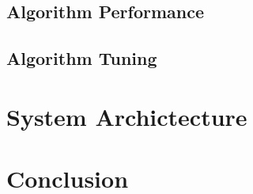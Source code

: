 \subsection{Algorithm Performance}

\subsection{Algorithm Tuning}

\section{System Archictecture}
\section{Conclusion}
